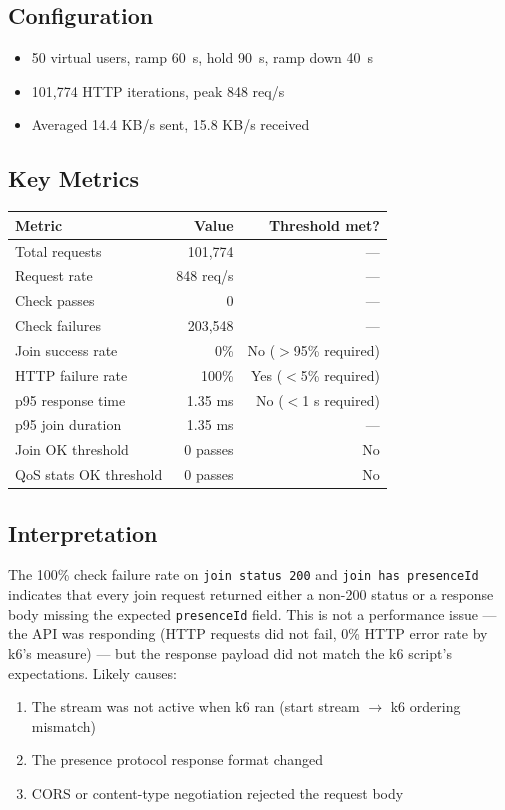 \documentclass[a4paper,11pt]{article}
\begin{document}
\subsection{Configuration}
\begin{itemize}
  \item 50 virtual users, ramp 60~s, hold 90~s, ramp down 40~s
  \item 101,774 HTTP iterations, peak 848 req/s
  \item Averaged 14.4 KB/s sent, 15.8 KB/s received
\end{itemize}

\subsection{Key Metrics}
\begin{center}
\begin{tabular}{lrr}
\toprule
\textbf{Metric} & \textbf{Value} & \textbf{Threshold met?} \\
\midrule
Total requests & 101,774 & --- \\
Request rate & 848 req/s & --- \\
Check passes & 0 & --- \\
Check failures & 203,548 & --- \\
Join success rate & 0\% & No ($>$95\% required) \\
HTTP failure rate & 100\% & Yes ($<$5\% required) \\
p95 response time & 1.35 ms & No ($<$1 s required) \\
p95 join duration & 1.35 ms & --- \\
Join OK threshold & 0 passes & No \\
QoS stats OK threshold & 0 passes & No \\
\bottomrule
\end{tabular}
\end{center}

\subsection{Interpretation}
The 100\% check failure rate on \texttt{join status 200} and \texttt{join has presenceId} indicates that every join request returned either a non-200 status or a response body missing the expected \texttt{presenceId} field. This is not a performance issue --- the API was responding (HTTP requests did not fail, 0\% HTTP error rate by k6's measure) --- but the response payload did not match the k6 script's expectations. Likely causes:
\begin{enumerate}
  \item The stream was not active when k6 ran (start stream $\rightarrow$ k6 ordering mismatch)
  \item The presence protocol response format changed
  \item CORS or content-type negotiation rejected the request body
\end{enumerate}
\end{document}

